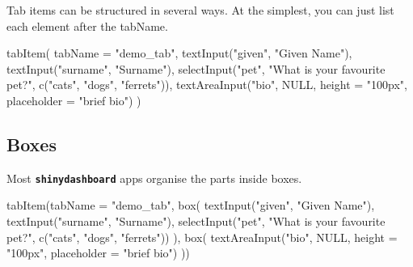 \documentclass[
  oneside]{book}
\newenvironment{Shaded}{\begin{snugshade}}{\end{snugshade}}
\newcommand{\AttributeTok}[1]{\textcolor[rgb]{0.77,0.63,0.00}{#1}}
\newcommand{\ConstantTok}[1]{\textcolor[rgb]{0.00,0.00,0.00}{#1}}
\newcommand{\FunctionTok}[1]{\textcolor[rgb]{0.00,0.00,0.00}{#1}}
\newcommand{\NormalTok}[1]{#1}
\newcommand{\StringTok}[1]{\textcolor[rgb]{0.31,0.60,0.02}{#1}}
\begin{document}
Tab items can be structured in several ways. At the simplest, you can just list each element after the \AttributeTok{tabName}.

\begin{Shaded}
\begin{Highlighting}[]
\FunctionTok{tabItem}\NormalTok{(}
  \AttributeTok{tabName =} \StringTok{"demo\_tab"}\NormalTok{,}
  \FunctionTok{textInput}\NormalTok{(}\StringTok{"given"}\NormalTok{, }\StringTok{"Given Name"}\NormalTok{),}
  \FunctionTok{textInput}\NormalTok{(}\StringTok{"surname"}\NormalTok{, }\StringTok{"Surname"}\NormalTok{),}
  \FunctionTok{selectInput}\NormalTok{(}\StringTok{"pet"}\NormalTok{, }\StringTok{"What is your favourite pet?"}\NormalTok{,}
              \FunctionTok{c}\NormalTok{(}\StringTok{"cats"}\NormalTok{, }\StringTok{"dogs"}\NormalTok{, }\StringTok{"ferrets"}\NormalTok{)),}
  \FunctionTok{textAreaInput}\NormalTok{(}\StringTok{"bio"}\NormalTok{, }\ConstantTok{NULL}\NormalTok{,}
                \AttributeTok{height =} \StringTok{"100px"}\NormalTok{,}
                \AttributeTok{placeholder =} \StringTok{"brief bio"}\NormalTok{)}
\NormalTok{)}
\end{Highlighting}
\end{Shaded}

\hypertarget{boxes}{%
\subsection{Boxes}\label{boxes}}

Most \textbf{\texttt{shinydashboard}} apps organise the parts inside boxes.

\begin{Shaded}
\begin{Highlighting}[]
\FunctionTok{tabItem}\NormalTok{(}\AttributeTok{tabName =} \StringTok{"demo\_tab"}\NormalTok{,}
        \FunctionTok{box}\NormalTok{(}
          \FunctionTok{textInput}\NormalTok{(}\StringTok{"given"}\NormalTok{, }\StringTok{"Given Name"}\NormalTok{),}
          \FunctionTok{textInput}\NormalTok{(}\StringTok{"surname"}\NormalTok{, }\StringTok{"Surname"}\NormalTok{),}
          \FunctionTok{selectInput}\NormalTok{(}\StringTok{"pet"}\NormalTok{, }\StringTok{"What is your favourite pet?"}\NormalTok{,}
                      \FunctionTok{c}\NormalTok{(}\StringTok{"cats"}\NormalTok{, }\StringTok{"dogs"}\NormalTok{, }\StringTok{"ferrets"}\NormalTok{))}
\NormalTok{        ),}
        \FunctionTok{box}\NormalTok{(}
          \FunctionTok{textAreaInput}\NormalTok{(}\StringTok{"bio"}\NormalTok{, }\ConstantTok{NULL}\NormalTok{,}
                        \AttributeTok{height =} \StringTok{"100px"}\NormalTok{,}
                        \AttributeTok{placeholder =} \StringTok{"brief bio"}\NormalTok{)}
\NormalTok{        ))}
\end{Highlighting}
\end{Shaded}
\end{document}
